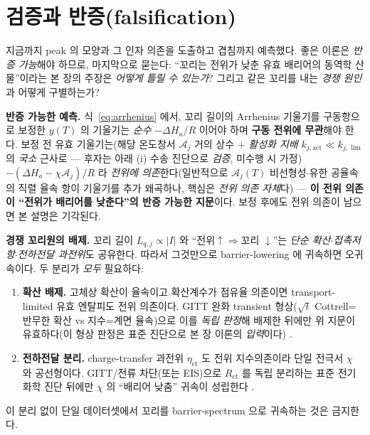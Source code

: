 \documentclass[11pt,a4paper]{article}
\begin{document}
\section{검증과 반증(falsification)}\label{sec:falsify}
지금까지 peak 의 모양과 그 인자 의존을 도출하고 겹침까지 예측했다. 좋은 이론은 \emph{반증 가능}해야 하므로,
마지막으로 묻는다: ``꼬리는 전위가 낮춘 유효 배리어의 동역학 산물''이라는 본 장의 주장은 \emph{어떻게 틀릴 수
있는가}? 그리고 같은 꼬리를 내는 \emph{경쟁 원인}과 어떻게 구별하는가?

\textbf{반증 가능한 예측.} 식~\eqref{eq:arrhenius} 에서, 꼬리 길이의 Arrhenius 기울기를 구동항으로 보정한 $y(T)$
의 기울기는 \emph{순수} $-\Delta H_a/R$ 이어야 하며 \textbf{구동 전위에 무관}해야 한다. 보정 전 유효 기울기는(해당
온도창서 $\mathcal A_j$ 거의 상수 $+$ \emph{활성화 지배} $k_{j,\mathrm{act}}\ll k_{j,\lim}$ 의 \emph{국소} 근사로 — 후자는
아래 (i) 수송 진단으로 \emph{검증}, 미수행 시 가정) $-(\Delta H_a-\chi\mathcal A_j)/R$ 라 \emph{전위에 의존}한다(일반적으로 $\mathcal A_j(T)$
비선형성$\cdot$유한 공율속의 직렬 율속 항이 기울기를 추가 왜곡하나, 핵심은 \emph{전위 의존 자체}다) — \textbf{이 전위
의존이 ``전위가 배리어를 낮춘다''의 반증 가능한 지문}이다. 보정 후에도 전위 의존이 남으면 본 설명은 기각된다.

\textbf{경쟁 꼬리원의 배제.} 꼬리 길이 $L_{q,j}\propto|I|$ 와 ``전위$\uparrow\Rightarrow$꼬리
$\downarrow$''는 \emph{단순 확산$\cdot$접촉저항$\cdot$전하전달 과전위}도 공유한다. 따라서 그것만으로
barrier-lowering 에 귀속하면 오귀속이다. 두 분리가 \emph{모두} 필요하다:
\begin{enumerate}[label=(\roman*),leftmargin=2.0em,itemsep=2pt]
\item \textbf{확산 배제.} 고체상 확산이 율속이고 확산계수가 점유율 의존이면 transport-limited 유효 엔탈피도 전위
  의존이다. GITT 완화 transient 형상($\sqrt t$ Cottrell=반무한 확산 vs 지수=계면 율속)으로 이를 \emph{독립 판정}해
  배제한 뒤에만 위 지문이 유효하다(이 형상 판정은 표준 진단으로 본 장 이론의 \emph{입력}이다) \cite{weppner1977}.
\item \textbf{전하전달 분리.} charge-transfer 과전위 $\eta_\mathrm{ct}$ 도 전위 지수의존이라 단일 전극서 $\chi$ 와
  공선형이다. GITT/전류 차단(또는 EIS)으로 $R_\mathrm{ct}$ 를 독립 분리하는 표준 전기화학 진단 뒤에만 $\chi$ 의
  ``배리어 낮춤'' 귀속이 성립한다 \cite{weppner1977,dubarry2012}.
\end{enumerate}
이 분리 없이 단일 데이터셋에서 꼬리를 barrier-spectrum 으로 귀속하는 것은 금지한다.
\end{document}
